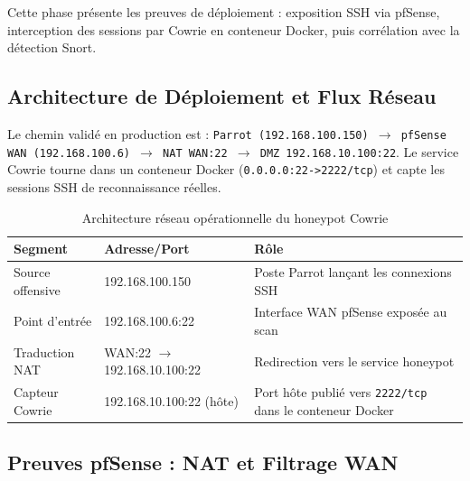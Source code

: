 \documentclass[12pt,a4paper,openany]{report}
\newcommand{\tableheadcolor}{\rowcolor{tableheadbg}}
\begin{document}
	\begin{tcolorbox}[colback=primary!5!white, colframe=primary, title=\textbf{Objectifs de la section}]
		Cette phase présente les preuves de déploiement : exposition SSH via pfSense, interception des sessions par Cowrie en conteneur Docker, puis corrélation avec la détection Snort.
	\end{tcolorbox}
	
	\subsection{Architecture de Déploiement et Flux Réseau}
	
	Le chemin validé en production est : \texttt{Parrot (192.168.100.150) $\rightarrow$ pfSense WAN (192.168.100.6) $\rightarrow$ NAT WAN:22 $\rightarrow$ DMZ 192.168.10.100:22}. Le service Cowrie tourne dans un conteneur Docker (\texttt{0.0.0.0:22->2222/tcp}) et capte les sessions SSH de reconnaissance réelles.
	
	\begin{table}[H]
		\centering
		\renewcommand{\arraystretch}{1.4}
		\setlength{\arrayrulewidth}{0.5pt}
		\begin{tabular}{p{2.8cm} p{4.1cm} p{4.8cm}}
			\arrayrulecolor{tableborder}
			\hline
			\tableheadcolor
			\textcolor{tableheadfg}{\textbf{Segment}} &
			\textcolor{tableheadfg}{\textbf{Adresse/Port}} &
			\textcolor{tableheadfg}{\textbf{Rôle}} \\
			\hline
			\rowcolor{tablerowalt}
			Source offensive & 192.168.100.150 & Poste Parrot lançant les connexions SSH \\
			Point d'entrée & 192.168.100.6:22 & Interface WAN pfSense exposée au scan \\
			\rowcolor{tablerowalt}
			Traduction NAT & WAN:22 $\rightarrow$ 192.168.10.100:22 & Redirection vers le service honeypot \\
			Capteur Cowrie & 192.168.10.100:22 (hôte) & Port hôte publié vers \texttt{2222/tcp} dans le conteneur Docker \\
			\hline
		\end{tabular}
		\caption{Architecture réseau opérationnelle du honeypot Cowrie}
		\label{tab:cowrie-architecture}
	\end{table}
	
	\subsection{Preuves pfSense : NAT et Filtrage WAN}
	
\end{document}
